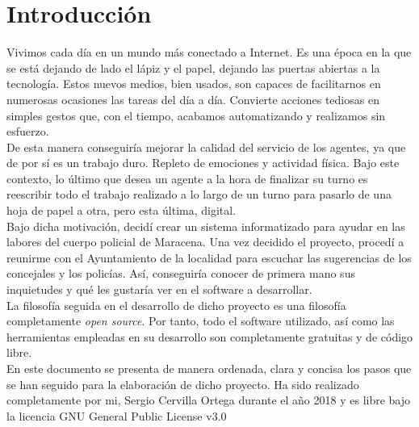 \chapter{Introducción}

Vivimos cada día en un mundo más conectado a Internet. Es una época en la que se está dejando de 
lado el lápiz y el papel, dejando las puertas abiertas a la tecnología. Estos nuevos medios, bien
usados, son capaces de facilitarnos en numerosas ocasiones las tareas del día a día. Convierte acciones
tediosas en simples gestos que, con el tiempo, acabamos automatizando y realizamos sin esfuerzo.\\ 

De esta manera conseguiría mejorar la calidad del servicio de los agentes, ya que de por sí es un 
trabajo duro. Repleto de emociones y actividad física. Bajo este contexto, lo último que desea un
agente a la hora de finalizar su turno es reescribir todo el trabajo realizado a lo largo de un 
turno para pasarlo de una hoja de papel a otra, pero esta última, digital.\\ 

Bajo dicha motivación, decidí crear un sistema informatizado para ayudar en las labores del cuerpo 
policial de Maracena. Una vez decidido el proyecto, procedí a reunirme con el Ayuntamiento de la 
localidad para escuchar las sugerencias de los  concejales y los policías. Así, conseguiría conocer de 
primera mano  sus inquietudes y qué les gustaría ver en el software a desarrollar.\\

La filosofía seguida en el desarrollo de dicho proyecto es una filosofía completamente \textit{open source}.
Por tanto, todo el software utilizado, así como las herramientas empleadas en su desarrollo son completamente
gratuitas y de código libre.\\ 


En este documento se presenta de manera ordenada, clara y concisa los pasos que se han seguido para
la elaboración de dicho proyecto. Ha sido realizado completamente por mi, Sergio Cervilla Ortega durante 
el año 2018 y es libre bajo la licencia GNU General Public License v3.0 \cite{gplv3}\\ 


